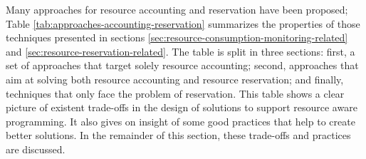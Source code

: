 Many approaches for resource accounting and reservation have been proposed; Table \ref{tab:approaches-accounting-reservation} summarizes the properties of those techniques presented in sections \ref{sec:resource-consumption-monitoring-related} and \ref{sec:resource-reservation-related}.
The table is split in three sections: first, a set of approaches that target solely resource accounting; second, approaches that aim at solving both resource accounting and resource reservation; and finally, techniques that only face the problem of reservation.
This table shows a clear picture of existent trade-offs in the design of solutions to support resource aware programming.
It also gives on insight of some good practices that help to create better solutions.
In the remainder of this section, these trade-offs and practices are discussed.

